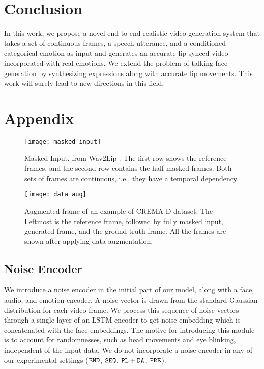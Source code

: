 \documentclass[accepted]{uai2023}
\begin{document}
\section{Conclusion}
In this work, we propose a novel end-to-end realistic video generation system that takes a set of continuous frames, a speech utterance, and a conditioned categorical emotion as input and generates an accurate lip-synced video incorporated with real emotions. We extend the problem of talking face generation by synthesizing expressions along with accurate lip movements. This work will surely lead to new directions in this field.











\appendix

\clearpage
\section{Appendix}

\begin{figure}[htp]
    \centering
    \texttt{[image: masked\_input]}
    \caption{Masked Input, from Wav2Lip \cite{prajwal2020lip}. The first row shows the reference frames, and the second row contains the half-masked frames. Both sets of frames are continuous, i.e., they have a temporal dependency.}
    \label{fig:masked_input}
\end{figure}

\begin{figure}[htp]
    \centering
    \texttt{[image: data\_aug]}
    \caption{Augmented frame of an example of CREMA-D \cite{cao2014crema} dataset. The Leftmost is the reference frame, followed by fully masked input, generated frame, and the ground truth frame. All the frames are shown after applying data augmentation.}
    \label{fig:data_aug}
\end{figure} 

\subsection{Noise Encoder}
We introduce a noise encoder in the initial part of our model, along with a face, audio, and emotion encoder. A noise vector is drawn from the standard Gaussian distribution for each video frame. We process this sequence of noise vectors through a single layer of an LSTM \citep{hochreiter1997long} encoder to get noise embedding which is concatenated with the face embeddings. The motive for introducing this module is to account for randomnesses, such as head movements and eye blinking, independent of the input data. We do not incorporate a noise encoder in any of our experimental settings ({${\tt END}$}, {${\tt SEQ}$}, {${\tt PL+DA}$}, {${\tt PRE}$}).
\end{document}
